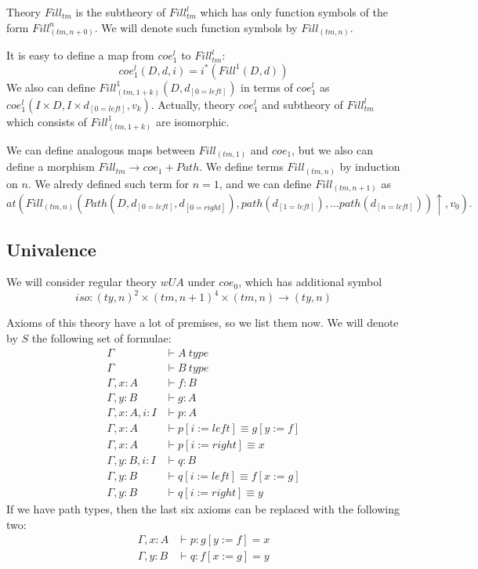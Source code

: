 \documentclass[reqno]{amsart}
\theoremstyle{definition}
\theoremstyle{remark}
\newcommand{\deq}{\equiv}
\newcommand{\repl}{:=}
\numberwithin{figure}{section}
\begin{document}
Theory $Fill_{tm}$ is the subtheory of $Fill^l_{tm}$ which has only function symbols of the form $Fill^n_{(tm,n+0)}$.
We will denote such function symbols by $Fill_{(tm,n)}$.

It is easy to define a map from $coe^l_1$ to $Fill^l_{tm}$:
\[ coe^l_1(D, d, i) = i^*(Fill^1(D, d)) \]
We also can define $Fill^1_{(tm,1+k)}(D, d_{[0=left]})$ in terms of $coe^l_1$ as $coe^l_1(I \times D, I \times d_{[0 = left]}, v_k)$.
Actually, theory $coe^l_1$ and subtheory of $Fill^l_{tm}$ which consists of $Fill^1_{(tm,1+k)}$ are isomorphic.

We can define analogous maps between $Fill_{(tm,1)}$ and $coe_1$, but we also can define a morphism $Fill_{tm} \to coe_1 + Path$.
We define terms $Fill_{(tm,n)}$ by induction on $n$.
We alredy defined such term for $n = 1$, and we can define $Fill_{(tm,n+1)}$ as
\[ at(Fill_{(tm,n)}(Path(D, d_{[0=left]}, d_{[0=right]}), path(d_{[1=left]}), \ldots path(d_{[n=left]}))\!\uparrow, v_0). \]

\subsection{Univalence}
\label{sec:univalence}

We will consider regular theory $wUA$ under $coe_0$, which has additional symbol
\[ iso : (ty,n)^2 \times (tm,n+1)^4 \times (tm,n) \to (ty,n) \]

Axioms of this theory have a lot of premises, so we list them now.
We will denote by $S$ the following set of formulae:
\begin{align*}
\Gamma & \vdash A\ type \\
\Gamma & \vdash B\ type \\
\Gamma, x : A & \vdash f : B \\
\Gamma, y : B & \vdash g : A \\
\Gamma, x : A, i : I & \vdash p : A \\
\Gamma, x : A & \vdash p[i \repl left] \deq g[y \repl f] \\
\Gamma, x : A & \vdash p[i \repl right] \deq x \\
\Gamma, y : B, i : I & \vdash q : B \\
\Gamma, y : B & \vdash q[i \repl left] \deq f[x \repl g] \\
\Gamma, y : B & \vdash q[i \repl right] \deq y
\end{align*}
If we have path types, then the last six axioms can be replaced with the following two:
\begin{align*}
\Gamma, x : A & \vdash p : g[y \repl f] = x \\
\Gamma, y : B & \vdash q : f[x \repl g] = y
\end{align*}
\end{document}
